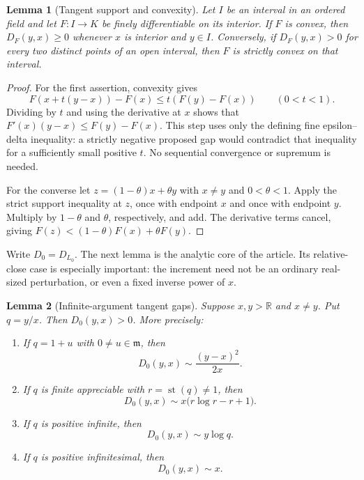 \documentclass[11pt,letterpaper]{article}
\numberwithin{equation}{section}
\theoremstyle{plain}
\newtheorem{lemma}[lemma]{Lemma}
\theoremstyle{definition}
\theoremstyle{remark}
\newcommand{\R}{\mathbb R}
\newcommand{\mi}{\mathfrak m}
\newcommand{\st}{\operatorname{st}}
\begin{document}
\begin{lemma}[Tangent support and convexity]\label{lem:tangent-convex}
Let $I$ be an interval in an ordered field and let $F:I\to K$ be finely
differentiable on its interior.
If $F$ is convex, then $D_F(y,x)\ge0$ whenever $x$ is interior and $y\in I$.
Conversely, if $D_F(y,x)>0$ for every two distinct points of an open interval,
then $F$ is strictly convex on that interval.
\end{lemma}
\begin{proof}
For the first assertion, convexity gives
\[
 F(x+t(y-x))-F(x)\le t(F(y)-F(x))\qquad(0<t<1).
\]
Dividing by $t$ and using the derivative at $x$ shows that
$F'(x)(y-x)\le F(y)-F(x)$. This step uses only the defining
fine epsilon--delta inequality: a strictly negative proposed gap would
contradict that inequality for a sufficiently small positive $t$.
No sequential convergence or supremum is needed.

For the converse let $z=(1-\theta)x+\theta y$ with $x\ne y$ and
$0<\theta<1$. Apply the strict support inequality at $z$, once with
endpoint $x$ and once with endpoint $y$. Multiply by $1-\theta$ and
$\theta$, respectively, and add. The derivative terms cancel, giving
$F(z)<(1-\theta)F(x)+\theta F(y)$.
\end{proof}

Write $D_0=D_{L_0}$. The next lemma is the analytic core of the article.
Its relative-close case is especially important: the increment need not be
an ordinary real-sized perturbation, or even a fixed inverse power of $x$.

\begin{lemma}[Infinite-argument tangent gaps]\label{lem:infinite-gaps}
Suppose $x,y>\R$ and $x\ne y$. Put $q=y/x$. Then $D_0(y,x)>0$.
More precisely:
\begin{enumerate}[label=(\roman*)]
\item If $q=1+u$ with $0\ne u\in\mi$, then
\begin{equation}\label{eq:near-gap}
 D_0(y,x)\sim\frac{(y-x)^2}{2x}.
\end{equation}
\item If $q$ is finite appreciable with $r=\st(q)\ne1$, then
\begin{equation}\label{eq:comparable-gap}
 D_0(y,x)\sim x\bigl(r\log r-r+1\bigr).
\end{equation}
\item If $q$ is positive infinite, then
\begin{equation}\label{eq:up-gap}
 D_0(y,x)\sim y\log q.
\end{equation}
\item If $q$ is positive infinitesimal, then
\begin{equation}\label{eq:down-gap}
 D_0(y,x)\sim x.
\end{equation}
\end{enumerate}
\end{lemma}
\end{document}
